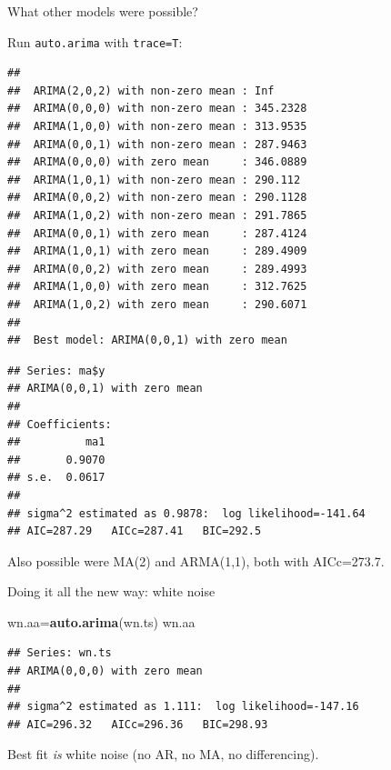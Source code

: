 \documentclass[
  ignorenonframetext,
]{beamer}
\newenvironment{Shaded}{\begin{snugshade}}{\end{snugshade}}
\newcommand{\DataTypeTok}[1]{\textcolor[rgb]{0.13,0.29,0.53}{#1}}
\newcommand{\KeywordTok}[1]{\textcolor[rgb]{0.13,0.29,0.53}{\textbf{#1}}}
\newcommand{\NormalTok}[1]{#1}
\newcommand{\OperatorTok}[1]{\textcolor[rgb]{0.81,0.36,0.00}{\textbf{#1}}}
\begin{document}
\begin{frame}[fragile]{What other models were possible?}
\protect\hypertarget{what-other-models-were-possible}{}

Run \texttt{auto.arima} with \texttt{trace=T}:

\small

\begin{Shaded}
\end{Shaded}

\begin{verbatim}
## 
##  ARIMA(2,0,2) with non-zero mean : Inf
##  ARIMA(0,0,0) with non-zero mean : 345.2328
##  ARIMA(1,0,0) with non-zero mean : 313.9535
##  ARIMA(0,0,1) with non-zero mean : 287.9463
##  ARIMA(0,0,0) with zero mean     : 346.0889
##  ARIMA(1,0,1) with non-zero mean : 290.112
##  ARIMA(0,0,2) with non-zero mean : 290.1128
##  ARIMA(1,0,2) with non-zero mean : 291.7865
##  ARIMA(0,0,1) with zero mean     : 287.4124
##  ARIMA(1,0,1) with zero mean     : 289.4909
##  ARIMA(0,0,2) with zero mean     : 289.4993
##  ARIMA(1,0,0) with zero mean     : 312.7625
##  ARIMA(1,0,2) with zero mean     : 290.6071
## 
##  Best model: ARIMA(0,0,1) with zero mean
\end{verbatim}

\begin{verbatim}
## Series: ma$y 
## ARIMA(0,0,1) with zero mean 
## 
## Coefficients:
##          ma1
##       0.9070
## s.e.  0.0617
## 
## sigma^2 estimated as 0.9878:  log likelihood=-141.64
## AIC=287.29   AICc=287.41   BIC=292.5
\end{verbatim}

\normalsize

Also possible were MA(2) and ARMA(1,1), both with AICc=273.7.

\end{frame}

\begin{frame}[fragile]{Doing it all the new way: white noise}
\protect\hypertarget{doing-it-all-the-new-way-white-noise}{}

\begin{Shaded}
\begin{Highlighting}[]
\NormalTok{wn.aa=}\KeywordTok{auto.arima}\NormalTok{(wn.ts)}
\NormalTok{wn.aa}
\end{Highlighting}
\end{Shaded}

\begin{verbatim}
## Series: wn.ts 
## ARIMA(0,0,0) with zero mean 
## 
## sigma^2 estimated as 1.111:  log likelihood=-147.16
## AIC=296.32   AICc=296.36   BIC=298.93
\end{verbatim}

Best fit \emph{is} white noise (no AR, no MA, no differencing).

\end{frame}
\end{document}

